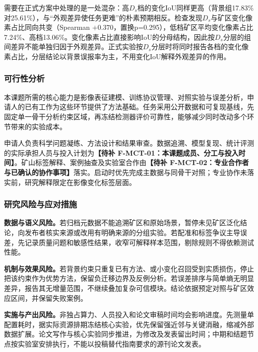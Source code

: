 需要在正式方案中处理的是一处混杂：高$D_s$档的变化IoU同样更高（背景组17.83\%对25.61\%），与“外观差异使任务更难”的朴素预期相反。检查发现$D_s$与矿区变化像素占比同向共变（Spearman $+0.370$，置换p=0.295），低档矿区平均变化像素占比7.24\%、高档13.06\%。变化像素占比直接影响IoU的分母结构，因此按$D_s$分层的组间差异不能单独归因于外观差异。正式实验按$D_s$分层时将同时报告各档的变化像素占比，分层结论以背景误报率为主，不用变化IoU解释外观差异的作用。

\FloatBarrier
\subsubsection{可行性分析}
本课题所需的核心能力是影像表征建模、训练协议管理、对照实验与误差分析，申请人的已有工作为这些环节提供了方法基础。任务采用公开数据和可复现基线，先固定单一骨干分析约束区域，再冻结检测器评价可靠性，能够减少同时改动多个环节带来的实验成本。

申请人负责科学问题凝练、方法设计和结果审查。数据追溯、模型复现、统计评测的实际承担人员与投入计划为\textbf{【待补 F-MCT-01：本课题成员、分工与投入时间】}。矿山标签解释、案例抽查及实验室合作由\textbf{【待补 F-MCT-02：专业合作者与已确认的协作事项】}落实。启动时优先完成主数据与同骨干对照；专业协作未落实前，研究解释限定在影像变化标签层面。

\subsubsection{研究风险与应对措施}
\textbf{数据与语义风险。}若归档元数据不能追溯矿区和原始场景，暂停未见矿区泛化结论，向发布者核实来源或改用有明确来源的分组实验。若配准和标签争议主导误差，先记录质量问题和敏感性结果，收窄可解释样本范围，剔除规则不得依赖测试性能。

\textbf{机制与效果风险。}若背景约束只重复已有方法、或小变化召回受到实质损伤，停止把该约束作为优势方法，保留负迁移边界及反例分析。若误差排序与简单熵无明显差异，报告其无增量范围，不继续叠加复杂可信模块。结论依据预定对照与矿区效应区间，并保留失败案例。

\textbf{实施与产出风险。}非独占算力、人员投入和论文审稿时间均会影响进度。先测量单配置耗时，据实际资源排期冻结核心实验，优先保留强近邻与关键消融，缩减外部数据扩展。论文写作与核心实验同步推进，为修改及发表留出时间；中期和结题节点按实验室安排执行，不能以投稿替代指南要求的源刊论文发表。
